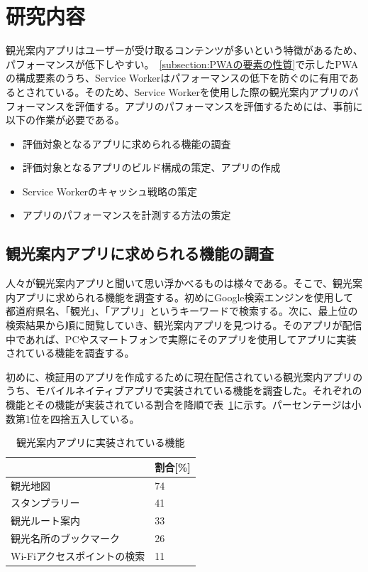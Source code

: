 \section{研究内容}
\label{section:研究内容}
観光案内アプリはユーザーが受け取るコンテンツが多いという特徴があるため、パフォーマンスが低下しやすい。~\autoref{subsection:PWAの要素の性質}で示したPWAの構成要素のうち、Service Workerはパフォーマンスの低下を防ぐのに有用であるとされている。そのため、Service Workerを使用した際の観光案内アプリのパフォーマンスを評価する。アプリのパフォーマンスを評価するためには、事前に以下の作業が必要である。
\begin{itemize}
    \item 評価対象となるアプリに求められる機能の調査
    \item 評価対象となるアプリのビルド構成の策定、アプリの作成
    \item Service Workerのキャッシュ戦略の策定
    \item アプリのパフォーマンスを計測する方法の策定
\end{itemize}
\subsection{観光案内アプリに求められる機能の調査}
\label{subsubsection:観光案内アプリに求められる機能の調査}
人々が観光案内アプリと聞いて思い浮かべるものは様々である。そこで、観光案内アプリに求められる機能を調査する。初めにGoogle検索エンジンを使用して都道府県名、「観光」、「アプリ」というキーワードで検索する。次に、最上位の検索結果から順に閲覧していき、観光案内アプリを見つける。そのアプリが配信中であれば、PCやスマートフォンで実際にそのアプリを使用してアプリに実装されている機能を調査する。

初めに、検証用のアプリを作成するために現在配信されている観光案内アプリのうち、モバイルネイティブアプリで実装されている機能を調査した。それぞれの機能とその機能が実装されている割合を降順で表~\ref{table:観光案内アプリに実装されている機能}に示す。パーセンテージは小数第1位を四捨五入している。
\begin{table}
  \caption{観光案内アプリに実装されている機能}
  \label{table:観光案内アプリに実装されている機能}
  \centering
  \begin{tabular}{|p{15em}|p{10em}|}
    \hline
    & 割合[\%] \\ \hline
    観光地図 & 74 \\ \hline
    スタンプラリー & 41\\ \hline
    観光ルート案内 & 33\\ \hline
    観光名所のブックマーク & 26\\ \hline
    Wi-Fiアクセスポイントの検索 & 11 \\ \hline
  \end{tabular}
\end{table}

